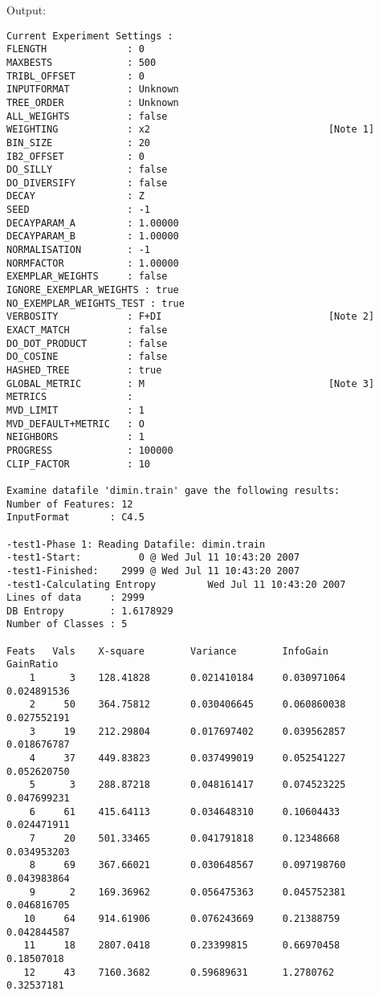 \documentclass{report}
\begin{document}
Output:
\begin{footnotesize}
\begin{verbatim}
Current Experiment Settings :
FLENGTH              : 0
MAXBESTS             : 500
TRIBL_OFFSET         : 0
INPUTFORMAT          : Unknown
TREE_ORDER           : Unknown
ALL_WEIGHTS          : false
WEIGHTING            : x2                               [Note 1]
BIN_SIZE             : 20
IB2_OFFSET           : 0
DO_SILLY             : false
DO_DIVERSIFY         : false
DECAY                : Z
SEED                 : -1
DECAYPARAM_A         : 1.00000
DECAYPARAM_B         : 1.00000
NORMALISATION        : -1
NORMFACTOR           : 1.00000
EXEMPLAR_WEIGHTS     : false
IGNORE_EXEMPLAR_WEIGHTS : true
NO_EXEMPLAR_WEIGHTS_TEST : true
VERBOSITY            : F+DI                             [Note 2]
EXACT_MATCH          : false
DO_DOT_PRODUCT       : false
DO_COSINE            : false
HASHED_TREE          : true
GLOBAL_METRIC        : M                                [Note 3]
METRICS              : 
MVD_LIMIT            : 1
MVD_DEFAULT+METRIC   : O
NEIGHBORS            : 1
PROGRESS             : 100000
CLIP_FACTOR          : 10

Examine datafile 'dimin.train' gave the following results:
Number of Features: 12
InputFormat       : C4.5

-test1-Phase 1: Reading Datafile: dimin.train
-test1-Start:          0 @ Wed Jul 11 10:43:20 2007
-test1-Finished:    2999 @ Wed Jul 11 10:43:20 2007
-test1-Calculating Entropy         Wed Jul 11 10:43:20 2007
Lines of data     : 2999
DB Entropy        : 1.6178929
Number of Classes : 5

Feats   Vals    X-square        Variance        InfoGain        GainRatio
    1      3    128.41828       0.021410184     0.030971064     0.024891536
    2     50    364.75812       0.030406645     0.060860038     0.027552191
    3     19    212.29804       0.017697402     0.039562857     0.018676787
    4     37    449.83823       0.037499019     0.052541227     0.052620750
    5      3    288.87218       0.048161417     0.074523225     0.047699231
    6     61    415.64113       0.034648310     0.10604433      0.024471911
    7     20    501.33465       0.041791818     0.12348668      0.034953203
    8     69    367.66021       0.030648567     0.097198760     0.043983864
    9      2    169.36962       0.056475363     0.045752381     0.046816705
   10     64    914.61906       0.076243669     0.21388759      0.042844587
   11     18    2807.0418       0.23399815      0.66970458      0.18507018
   12     43    7160.3682       0.59689631      1.2780762       0.32537181


\end{verbatim}
\end{footnotesize}
\end{document}

